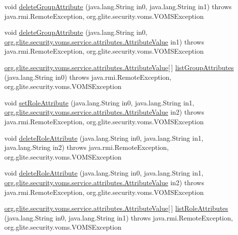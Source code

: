 \begin{DoxyCompactItemize}
\item 
void \hyperlink{classorg_1_1glite_1_1security_1_1voms_1_1service_1_1attributes_1_1VOMSAttributesSoapBindingImpl_a1084c612b6fdfed4a455485436daa601}{deleteGroupAttribute} (java.lang.String in0, java.lang.String in1)  throws java.rmi.RemoteException, org.glite.security.voms.VOMSException 
\item 
void \hyperlink{classorg_1_1glite_1_1security_1_1voms_1_1service_1_1attributes_1_1VOMSAttributesSoapBindingImpl_a64a781b2ff6b51c82274bd51d50c8c44}{deleteGroupAttribute} (java.lang.String in0, \hyperlink{classorg_1_1glite_1_1security_1_1voms_1_1service_1_1attributes_1_1AttributeValue}{org.glite.security.voms.service.attributes.AttributeValue} in1)  throws java.rmi.RemoteException, org.glite.security.voms.VOMSException 
\item 
\hyperlink{classorg_1_1glite_1_1security_1_1voms_1_1service_1_1attributes_1_1AttributeValue}{org.glite.security.voms.service.attributes.AttributeValue}\mbox{[}$\,$\mbox{]} \hyperlink{classorg_1_1glite_1_1security_1_1voms_1_1service_1_1attributes_1_1VOMSAttributesSoapBindingImpl_a3b15cf4aa7f4258fd13754fdb1233b3e}{listGroupAttributes} (java.lang.String in0)  throws java.rmi.RemoteException, org.glite.security.voms.VOMSException 
\item 
void \hyperlink{classorg_1_1glite_1_1security_1_1voms_1_1service_1_1attributes_1_1VOMSAttributesSoapBindingImpl_a7e1e971b29677f9ae6418ad57e347748}{setRoleAttribute} (java.lang.String in0, java.lang.String in1, \hyperlink{classorg_1_1glite_1_1security_1_1voms_1_1service_1_1attributes_1_1AttributeValue}{org.glite.security.voms.service.attributes.AttributeValue} in2)  throws java.rmi.RemoteException, org.glite.security.voms.VOMSException 
\item 
void \hyperlink{classorg_1_1glite_1_1security_1_1voms_1_1service_1_1attributes_1_1VOMSAttributesSoapBindingImpl_a9a1d8cdbfc1c77f634ba1b34a974fcf1}{deleteRoleAttribute} (java.lang.String in0, java.lang.String in1, java.lang.String in2)  throws java.rmi.RemoteException, org.glite.security.voms.VOMSException 
\item 
void \hyperlink{classorg_1_1glite_1_1security_1_1voms_1_1service_1_1attributes_1_1VOMSAttributesSoapBindingImpl_a2f89b924ae171cdc05cef27ea04e0f2c}{deleteRoleAttribute} (java.lang.String in0, java.lang.String in1, \hyperlink{classorg_1_1glite_1_1security_1_1voms_1_1service_1_1attributes_1_1AttributeValue}{org.glite.security.voms.service.attributes.AttributeValue} in2)  throws java.rmi.RemoteException, org.glite.security.voms.VOMSException 
\item 
\hyperlink{classorg_1_1glite_1_1security_1_1voms_1_1service_1_1attributes_1_1AttributeValue}{org.glite.security.voms.service.attributes.AttributeValue}\mbox{[}$\,$\mbox{]} \hyperlink{classorg_1_1glite_1_1security_1_1voms_1_1service_1_1attributes_1_1VOMSAttributesSoapBindingImpl_a38dfa2facee366ff6875b94e85503a40}{listRoleAttributes} (java.lang.String in0, java.lang.String in1)  throws java.rmi.RemoteException, org.glite.security.voms.VOMSException 
\end{DoxyCompactItemize}


